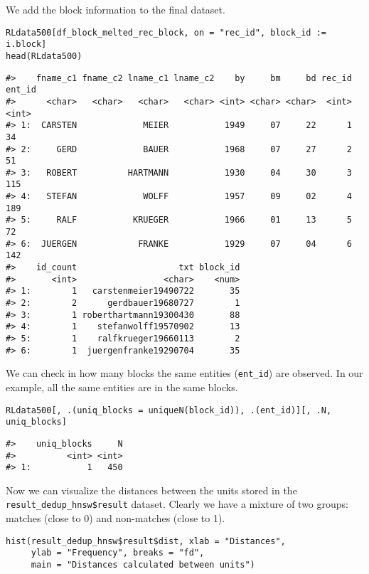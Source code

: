 We add the block information to the final dataset.

\begin{verbatim}
RLdata500[df_block_melted_rec_block, on = "rec_id", block_id := i.block]
head(RLdata500)
\end{verbatim}

\begin{verbatim}
#>    fname_c1 fname_c2 lname_c1 lname_c2    by     bm     bd rec_id ent_id
#>      <char>   <char>   <char>   <char> <int> <char> <char>  <int>  <int>
#> 1:  CARSTEN             MEIER           1949     07     22      1     34
#> 2:     GERD             BAUER           1968     07     27      2     51
#> 3:   ROBERT          HARTMANN           1930     04     30      3    115
#> 4:   STEFAN             WOLFF           1957     09     02      4    189
#> 5:     RALF           KRUEGER           1966     01     13      5     72
#> 6:  JUERGEN            FRANKE           1929     07     04      6    142
#>    id_count                    txt block_id
#>       <int>                 <char>    <num>
#> 1:        1   carstenmeier19490722       35
#> 2:        2      gerdbauer19680727        1
#> 3:        1 roberthartmann19300430       88
#> 4:        1    stefanwolff19570902       13
#> 5:        1    ralfkrueger19660113        2
#> 6:        1  juergenfranke19290704       35
\end{verbatim}

We can check in how many blocks the same entities (\texttt{ent\_id}) are
observed. In our example, all the same entities are in the same blocks.

\begin{verbatim}
RLdata500[, .(uniq_blocks = uniqueN(block_id)), .(ent_id)][, .N, uniq_blocks]
\end{verbatim}

\begin{verbatim}
#>    uniq_blocks     N
#>          <int> <int>
#> 1:           1   450
\end{verbatim}

Now we can visualize the distances between the units stored in the
\linebreak \texttt{result\_dedup\_hnsw\$result} dataset. Clearly we have a mixture
of two groups: matches (close to 0) and non-matches (close to 1).

\begin{verbatim}
hist(result_dedup_hnsw$result$dist, xlab = "Distances",
     ylab = "Frequency", breaks = "fd",
     main = "Distances calculated between units")
\end{verbatim}

